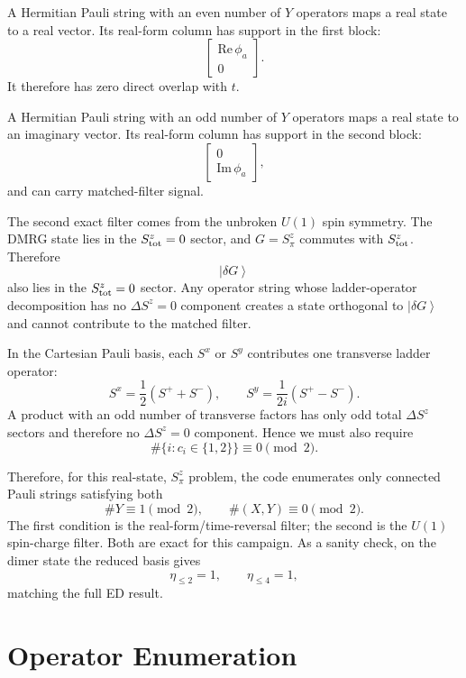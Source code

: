 \documentclass[11pt]{article}
\newcommand{\ket}[1]{\left|#1\right\rangle}
\newcommand{\dd}{\delta}
\begin{document}
A Hermitian Pauli string with an even number of $Y$ operators maps a real
state to a real vector.  Its real-form column has support in the first
block:
\[
  \begin{bmatrix}
    \mathrm{Re}\,\phi_a\\
    0
  \end{bmatrix}.
\]
It therefore has zero direct overlap with $t$.

A Hermitian Pauli string with an odd number of $Y$ operators maps a real
state to an imaginary vector.  Its real-form column has support in the
second block:
\[
  \begin{bmatrix}
    0\\
    \mathrm{Im}\,\phi_a
  \end{bmatrix},
\]
and can carry matched-filter signal.

The second exact filter comes from the unbroken $U(1)$ spin symmetry.
The DMRG state lies in the $S^z_{\rm tot}=0$ sector, and
$G=S^z_\pi$ commutes with $S^z_{\rm tot}$.  Therefore
\[
  \ket{\dd G}
\]
also lies in the $S^z_{\rm tot}=0$ sector.  Any operator string whose
ladder-operator decomposition has no $\Delta S^z=0$ component creates a
state orthogonal to $\ket{\dd G}$ and cannot contribute to the matched
filter.

In the Cartesian Pauli basis, each $S^x$ or $S^y$ contributes one
transverse ladder operator:
\[
  S^x=\frac12(S^+ + S^-),
  \qquad
  S^y=\frac{1}{2i}(S^+ - S^-).
\]
A product with an odd number of transverse factors has only odd total
$\Delta S^z$ sectors and therefore no $\Delta S^z=0$ component.  Hence
we must also require
\[
  \#\{i:c_i\in\{1,2\}\}\equiv0\pmod 2.
\]

Therefore, for this real-state, $S^z_\pi$ problem, the code enumerates
only connected Pauli strings satisfying both
\[
  \#Y\equiv1\pmod2,
  \qquad
  \#(X,Y)\equiv0\pmod2.
\]
The first condition is the real-form/time-reversal filter; the second is
the $U(1)$ spin-charge filter.  Both are exact for this campaign.  As a
sanity check, on the dimer state the reduced basis gives
\[
  \eta_{\le2}=1,
  \qquad
  \eta_{\le4}=1,
\]
matching the full ED result.

\section{Operator Enumeration}
\end{document}
